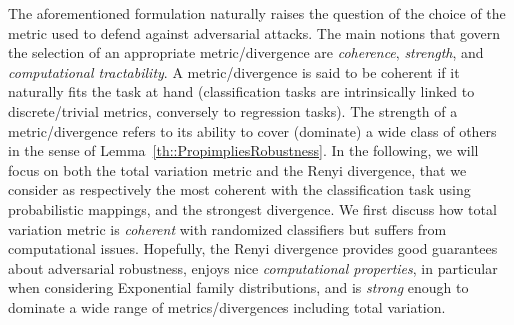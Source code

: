 The aforementioned formulation naturally raises the question of the choice of the metric used to defend against adversarial attacks. 
The main notions that govern the selection of an appropriate metric/divergence are  \emph{coherence}, \emph{strength}, and \emph{computational tractability}.
A metric/divergence is said to be coherent if it naturally fits the task at hand (\eg classification tasks are intrinsically linked to discrete/trivial metrics, conversely to regression tasks).
The strength of a metric/divergence refers to its ability to cover (dominate) a wide class of others in the sense of Lemma~\ref{th::PropimpliesRobustness}. 
In the following, we will focus on both the total variation metric and the Renyi divergence, that we consider as respectively the most coherent with the classification task using probabilistic mappings, and the strongest divergence.
We first discuss how total variation metric is \emph{coherent} with randomized classifiers but suffers from computational issues.
Hopefully, the Renyi divergence provides good guarantees about adversarial robustness, enjoys nice \emph{computational properties}, in particular when considering  Exponential family distributions, and is \emph{strong} enough to dominate a wide range of metrics/divergences including total variation.



